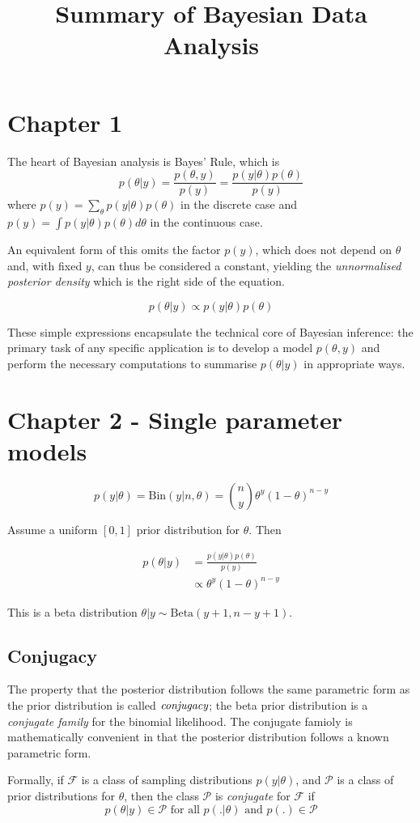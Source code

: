 \documentclass[11pt]{amsart}
\title{Summary of Bayesian Data Analysis}
\begin{document}
\maketitle
\section{Chapter 1}
The heart of Bayesian analysis is Bayes' Rule, which is
\[
	p(\theta|y) = \frac{p(\theta, y)}{p(y)} = \frac{p(y|\theta)p(\theta)}{p(y)}
\]
where $p(y) = \sum_\theta p(y|\theta) p(\theta)$ in the discrete case and
$p(y) = \int p(y|\theta)p(\theta) d\theta$ in the continuous case.

An equivalent form of this omits the factor $p(y)$, which does not depend on 
$\theta$ and, with fixed $y$, can thus be considered a constant, yielding the
\emph{unnormalised posterior density} which is the right side of the equation.

\[
p(\theta|y) \propto p(y|\theta)p(\theta)
\]

These simple expressions encapsulate the technical core of Bayesian inference:
the primary task of any specific application is to develop a model $p(\theta, y)$
and perform the necessary computations to summarise $p(\theta|y)$ in appropriate
ways.

\section{Chapter 2 - Single parameter models}


\[
	p(y|\theta) = \text{Bin}(y|n, \theta) = {n \choose y}\theta^y (1-\theta)^{n-y}
\]

Assume a uniform $[0, 1]$ prior distribution for $\theta$. Then

\begin{align*}
p(\theta|y) &=\frac{p(y|\theta)p(\theta)}{p(y)} \\
	& \propto \theta^y (1-\theta)^{n-y}
\end{align*}

This is a beta distribution $\theta|y \sim \text{Beta}(y+1, n-y+1)$.

\subsection{Conjugacy}
The property that the posterior distribution follows the same parametric form
as the prior distribution is called $\emph{conjugacy}$; the beta prior 
distribution is a \emph{conjugate family} for the binomial likelihood. The
conjugate famioly is mathematically convenient in that the posterior distribution
follows a known parametric form.

Formally, if $\mathcal{F}$ is a class of sampling distributions $p(y|\theta)$,
and $\mathcal{P}$ is a class of prior distributions for $\theta$, then the class
$\mathcal{P}$ is \emph{conjugate} for $\mathcal{F}$ if
\[
p(\theta|y) \in \mathcal{P}\text{ for all }p(.|\theta)\text{ and }p(.)\in \mathcal{P}
\]
\end{document}
